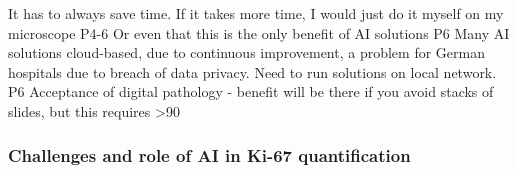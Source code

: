 It has to always save time. If it takes more time, I would just do it myself on my microscope P4-6 Or even that this is the only benefit of AI solutions P6
Many AI solutions cloud-based, due to continuous improvement, a problem for German hospitals due to breach of data privacy. Need to run solutions on local network. P6
Acceptance of digital pathology - benefit will be there if you avoid stacks of slides, but this requires >90%

\subsubsection{Challenges and role of AI in Ki-67 quantification}



